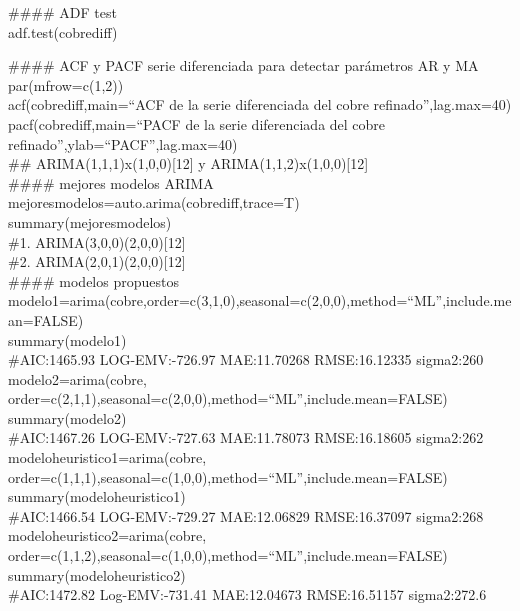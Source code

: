 \documentclass{report}
\begin{document}
\#\#\#\# ADF test\\
adf.test(cobrediff)\\
\vspace{3cm}

\#\#\#\# ACF y PACF serie diferenciada para detectar parámetros AR y MA \\
par(mfrow=c(1,2))\\
acf(cobrediff,main=``ACF de la serie diferenciada del cobre refinado'',lag.max=40) \\
pacf(cobrediff,main=``PACF de la serie diferenciada del cobre refinado'',ylab=``PACF'',lag.max=40)\\
\#\# ARIMA(1,1,1)x(1,0,0)[12] y ARIMA(1,1,2)x(1,0,0)[12]\\

\#\#\#\# mejores modelos ARIMA\\
mejoresmodelos=auto.arima(cobrediff,trace=T)\\
summary(mejoresmodelos)\\
\#1. ARIMA(3,0,0)(2,0,0)[12]\\
\#2. ARIMA(2,0,1)(2,0,0)[12]\\


\#\#\#\# modelos propuestos\\
modelo1=arima(cobre,order=c(3,1,0),seasonal=c(2,0,0),method=``ML'',include.mean=FALSE)\\
summary(modelo1)\\
\#AIC:1465.93 LOG-EMV:-726.97 MAE:11.70268 RMSE:16.12335 sigma2:260\\

modelo2=arima(cobre, order=c(2,1,1),seasonal=c(2,0,0),method=``ML'',include.mean=FALSE)\\
summary(modelo2)\\
\#AIC:1467.26 LOG-EMV:-727.63 MAE:11.78073 RMSE:16.18605 sigma2:262\\

modeloheuristico1=arima(cobre, order=c(1,1,1),seasonal=c(1,0,0),method=``ML'',include.mean=FALSE)\\
summary(modeloheuristico1) \\
\#AIC:1466.54 LOG-EMV:-729.27 MAE:12.06829 RMSE:16.37097 sigma2:268\\

modeloheuristico2=arima(cobre, order=c(1,1,2),seasonal=c(1,0,0),method=``ML'',include.mean=FALSE)\\
summary(modeloheuristico2)\\
\#AIC:1472.82 Log-EMV:-731.41 MAE:12.04673 RMSE:16.51157 sigma2:272.6\\
\end{document}
